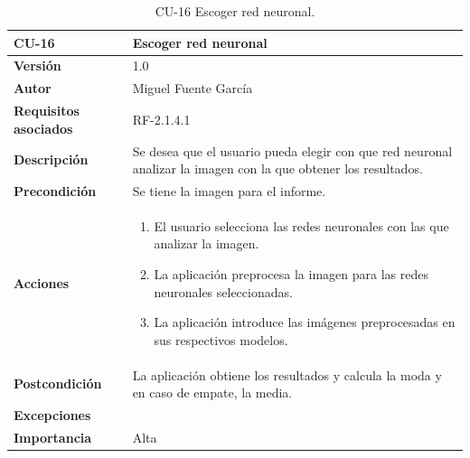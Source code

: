 \begin{table}[p]
	\centering
	\begin{tabularx}{\linewidth}{ p{} p{} }
		\toprule
		\textbf{CU-16}    & \textbf{Escoger red neuronal}\\
		\toprule
		\textbf{Versión}              & 1.0    \\
		\textbf{Autor}                & Miguel Fuente García \\
		\textbf{Requisitos asociados} & RF-2.1.4.1 \\
		\textbf{Descripción}          & Se desea que el usuario pueda elegir con que red neuronal analizar la imagen con la que obtener los resultados. \\
		\textbf{Precondición}         & Se tiene la imagen para el informe. \\
		\textbf{Acciones}             &
		\begin{enumerate}
			\def\labelenumi{\arabic{enumi}.}
			\tightlist
			\item El usuario selecciona las redes neuronales con las que analizar la imagen.
            \item La aplicación preprocesa la imagen para las redes neuronales seleccionadas.
            \item La aplicación introduce las imágenes preprocesadas en sus respectivos modelos.
		\end{enumerate}\\
		\textbf{Postcondición}        & La aplicación obtiene los resultados y calcula la moda y en caso de empate, la media. \\
		\textbf{Excepciones}          &  \\
		\textbf{Importancia}          & Alta  \\
		\bottomrule
	\end{tabularx}
	\caption{CU-16 Escoger red neuronal.}
\end{table}

